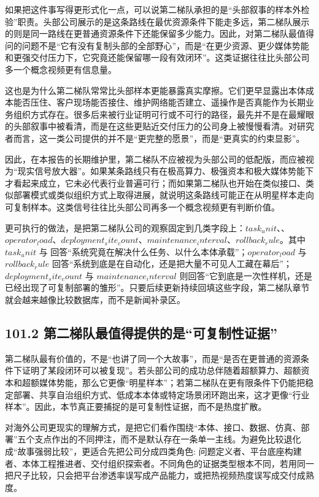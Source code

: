 如果把这件事写得更形式化一点，可以说第二梯队承担的是“头部叙事的样本外检验”职责。头部公司展示的是这条路线在最优资源条件下能走多远，第二梯队展示的则是同一路线在更普通资源条件下还能保留多少能力。因此，对第二梯队最值得问的问题不是“它有没有复制头部的全部野心”，而是“在更少资源、更少媒体势能和更强交付压力下，它究竟还能保留哪一段有效闭环”。这类证据往往比头部公司多一个概念视频更有信息量。

这也是为什么第二梯队常常比头部样本更能暴露真实摩擦。它们更早显露出本体成本能否压住、客户现场能否接住、维护网络能否建立、遥操作是否真能作为长期业务组织方式存在。很多后来被行业证明可行或不可行的路径，最先并不是在最耀眼的头部叙事中被看清，而是在这些更贴近交付压力的公司身上被慢慢看清。对研究者而言，这一类公司提供的并不是“更完整的愿景”，而是“更真实的约束显影”。

因此，在本报告的长期维护里，第二梯队不应被视为头部公司的低配版，而应被视为“现实信号放大器”。如果某条路线只有在极高算力、极强资本和极大媒体势能下才看起来成立，它未必代表行业普遍可行；而如果第二梯队也开始在类似接口、类似部署模式或类似组织方式上取得进展，就说明这条路线可能正在从明星样本走向可复制样本。这类信号往往比头部公司再多一个概念视频更有判断价值。

更可执行的做法，是把第二梯队公司的观察固定到几类字段上：\(task_unit\)、\texttt{}、\(operator_load\)、\(deployment_site_count\)、\(maintenance_interval\)、\(rollback_rule\)。其中 \(task_unit\) 与 \texttt{} 回答“系统究竟在解决什么任务、以什么本体承载”；\(operator_load\) 与 \(rollback_rule\) 回答“系统到底是在自动化，还是把大量不可见人工藏在幕后”；\(deployment_site_count\) 与 \(maintenance_interval\) 则回答“它到底是一次性样机，还是已经出现了可复制部署的雏形”。只要后续更新持续回填这些字段，第二梯队章节就会越来越像比较数据库，而不是新闻补录区。

\subsection*{101.2 第二梯队最值得提供的是“可复制性证据”}


第二梯队最有价值的，不是“也讲了同一个大故事”，而是“是否在更普通的资源条件下证明了某段闭环可以被复现”。若头部公司的成功总伴随着超额算力、超额资本和超额媒体势能，那么它更像“明星样本”；若第二梯队在更有限条件下仍能把稳定部署、共享自治组织方式、低成本本体或特定场景闭环跑出来，这才更像“行业样本”。因此，本节真正要捕捉的是可复制性证据，而不是热度扩散。

对海外公司更现实的理解方式，是把它们看作围绕“本体、接口、数据、仿真、部署”五个支点作出的不同押注，而不是默认存在一条单一主线。为避免比较退化成“故事强弱比较”，更适合先把公司分成四类角色: 问题定义者、平台底座构建者、本体工程推进者、交付组织探索者。不同角色的证据类型根本不同，若用同一把尺子比较，只会把平台渗透率误写成产品能力，或把热视频热度误写成交付成熟度。

